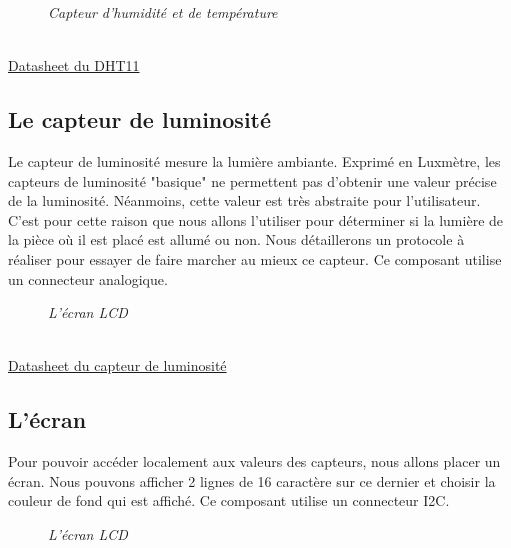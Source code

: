 \begin{figure}[H]
\begin{center}
\end{center}
	\caption{ \textit{Capteur d'humidité et de température}}
\end{figure}\\

\href{https://akizukidenshi.com/download/ds/aosong/DHT11.pdf}{Datasheet du DHT11}

\subsection{Le capteur de luminosité}

Le capteur de luminosité mesure la lumière ambiante. Exprimé en Luxmètre, les capteurs de luminosité "basique" ne permettent pas d'obtenir une valeur précise de la luminosité. Néanmoins, cette valeur est très abstraite pour l'utilisateur. C'est pour cette raison que nous allons l'utiliser pour déterminer si la lumière de la pièce où il est placé est allumé ou non. Nous détaillerons un protocole à réaliser pour essayer de faire marcher au mieux ce capteur. Ce composant utilise un connecteur analogique.\\

\begin{figure}[H]
\begin{center}
\end{center}
	\caption{ \textit{L'écran LCD}}
\end{figure}\\

\href{https://github.com/SeeedDocument/Grove_Light_Sensor/raw/master/res/LS06-M%CE%A65_datasheet.pdf}{Datasheet du capteur de luminosité}

\subsection{L'écran}

Pour pouvoir accéder localement aux valeurs des capteurs, nous allons placer un écran.
Nous pouvons afficher 2 lignes de 16 caractère sur ce dernier et choisir la couleur de fond qui est affiché. Ce composant utilise un connecteur I2C.\\

\begin{figure}[H]
\begin{center}
\end{center}
	\caption{ \textit{L'écran LCD}}
\end{figure}\\

